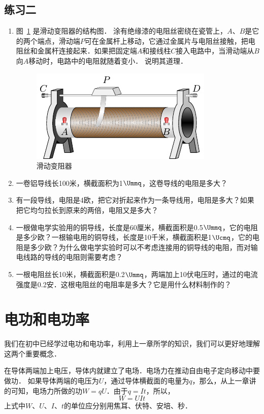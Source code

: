 \subsection*{练习二}

\begin{enumerate}
    \item 图~\ref{fig_B_7-4} 是滑动变阻器的结构图．
    涂有绝缘漆的电阻丝密绕在瓷管上，$A$、$B$是它的两个端点，滑动端$P$可在金属杆上移动，它通过金属片与电阻丝接触，把电阻丝和金属杆连接起来．如果把固定端$A$和接线柱$C$接入电路中，当滑动端从$B$向$A$移动时，电路中的电阻就随着变小．
    说明其道理．
    \begin{figure}[htbp]
        \centering
        \includegraphics{fig/B/7-4.pdf}
        \caption{滑动变阻器}\label{fig_B_7-4}
    \end{figure}
    \item 一卷铝导线长100米，横截面积为1$\Ummq$，这卷导线的电阻是多大？
    \item 有一段导线，电阻是4欧，把它对折起来作为一条导线用，电阻是多大？如果把它均匀拉长到原来的两倍，电阻又是多大？
    \item 一根做电学实验用的铜导线，长度是60厘米，横截面积是0.5$\Ummq$，它的电阻是多少欧？一根输电用的铜导线，长度是10千米，横截面积是1$\Ucmq$，它的电阻是多少欧？为什么做电学实验时可以不考虑连接用的铜导线的电阻，而对输电线路的导线的电阻则需要考虑？
    \item 一根电阻丝长10米，横截面积是0.2$\Ummq$，两端加上10伏电压时，通过的电流强度是0.2安．这根电阻丝的电阻率是多大？它是用什么材料制作的？
\end{enumerate}

\section{电功和电功率}
我们在初中已经学过电功和电功率，利用上一章所学的知识，我们可以更好地理解这两个重要概念．

在导体两端加上电压，导体内就建立了电场．电场力在推动自由电子定向移动中要做功．
如果导体两端的电压为$U$，通过导体横截面的电量为$q$，那么，从上一章讲的可知，电场力所做的功$W=qU$．由于$q=It$，所以，
\[W=UIt\]
上式中$W$、$U$、$I$、$t$的单位应分别用焦耳、伏特、安培、秒．

